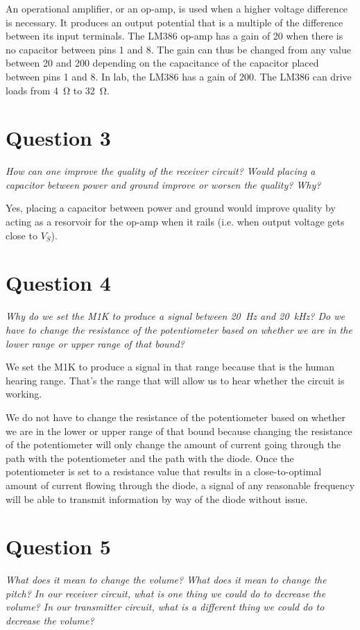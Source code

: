 \documentclass[12pt]{../manual}
\begin{document}
An operational amplifier, or an op-amp, is used when a higher voltage difference is necessary. It produces an output potential that is a multiple of the difference between its input terminals. The LM386 op-amp has a gain of 20 when there is no capacitor between pins 1 and 8. The gain can thus be changed from any value between 20 and 200 depending on the capacitance of the capacitor placed between pins 1 and 8. In lab, the LM386 has a gain of 200. The LM386 can drive loads from \SI{4}{\ohm} to \SI{32}{\ohm}.
\section{Question 3}
\textit{How can one improve the quality of the receiver circuit? Would placing a capacitor between power and ground improve or worsen the quality? Why?}

Yes, placing a capacitor between power and ground would improve quality by acting as a resorvoir for the op-amp when it rails (i.e. when output voltage gets close to $V_S$).

\newpage
\section{Question 4}
\textit{Why do we set the M1K to produce a signal between \SI{20}{\hertz} and \SI{20}{\kilo\hertz}? Do we have to change the resistance of the potentiometer based on whether we are in the lower range or upper range of that bound?}

We set the M1K to produce a signal in that range because that is the human hearing range. That's the range that will allow us to hear whether the circuit is working.

We do not have to change the resistance of the potentiometer based on whether we are in the lower or upper range of that bound because changing the resistance of the potentiometer will only change the amount of current going through the path with the potentiometer and the path with the diode. Once the potentiometer is set to a resistance value that results in a close-to-optimal amount of current flowing through the diode, a signal of any reasonable frequency will be able to transmit information by way of the diode without issue.
\section{Question 5}
\textit{What does it mean to change the volume? What does it mean to change the pitch? In our receiver circuit, what is one thing we could do to decrease the volume? In our transmitter circuit, what is a different thing we could do to decrease the volume?}
\end{document}

